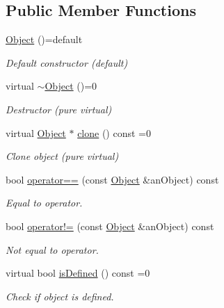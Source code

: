 \subsection*{Public Member Functions}
\begin{DoxyCompactItemize}
\item 
\hyperlink{classostk_1_1math_1_1geom_1_1d3_1_1_object_ac507d37b0ef8755045938e43d20b0c94}{Object} ()=default
\begin{DoxyCompactList}\small\item\em Default constructor (default) \end{DoxyCompactList}\item 
virtual \hyperlink{classostk_1_1math_1_1geom_1_1d3_1_1_object_af626942fbad7c1ea7ba80829fdaa0e01}{$\sim$\+Object} ()=0
\begin{DoxyCompactList}\small\item\em Destructor (pure virtual) \end{DoxyCompactList}\item 
virtual \hyperlink{classostk_1_1math_1_1geom_1_1d3_1_1_object}{Object} $\ast$ \hyperlink{classostk_1_1math_1_1geom_1_1d3_1_1_object_a676013f9555f6492687f9809b2db887b}{clone} () const =0
\begin{DoxyCompactList}\small\item\em Clone object (pure virtual) \end{DoxyCompactList}\item 
bool \hyperlink{classostk_1_1math_1_1geom_1_1d3_1_1_object_a6fe8c0313e995c880062130577ea8096}{operator==} (const \hyperlink{classostk_1_1math_1_1geom_1_1d3_1_1_object}{Object} \&an\+Object) const
\begin{DoxyCompactList}\small\item\em Equal to operator. \end{DoxyCompactList}\item 
bool \hyperlink{classostk_1_1math_1_1geom_1_1d3_1_1_object_ae17716327fca875a7f63d7fb501b0529}{operator!=} (const \hyperlink{classostk_1_1math_1_1geom_1_1d3_1_1_object}{Object} \&an\+Object) const
\begin{DoxyCompactList}\small\item\em Not equal to operator. \end{DoxyCompactList}\item 
virtual bool \hyperlink{classostk_1_1math_1_1geom_1_1d3_1_1_object_a271a1964cd208be85ce9a0a429395ad8}{is\+Defined} () const =0
\begin{DoxyCompactList}\small\item\em Check if object is defined. \end{DoxyCompactList}\item 

\end{DoxyCompactItemize}
